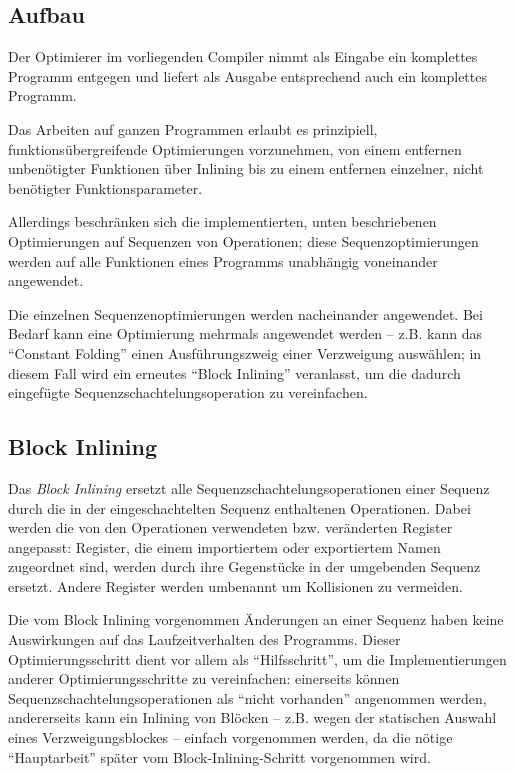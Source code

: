 \documentclass[twoside,a4paper,fleqn,12pt]{book}
\begin{document}
\subsection{Aufbau}


Der Optimierer im vorliegenden Compiler nimmt als Eingabe ein komplettes Programm entgegen
und liefert als Ausgabe entsprechend auch ein komplettes Programm.

Das Arbeiten auf ganzen Programmen erlaubt es prinzipiell, funktionsübergreifende Optimierungen
vorzunehmen, von einem entfernen unbenötigter Funktionen über Inlining bis zu einem entfernen
einzelner, nicht benötigter Funktionsparameter.

Allerdings beschränken sich die implementierten, unten beschriebenen Optimierungen auf Sequenzen
von Operationen; diese Sequenzoptimierungen werden auf alle Funktionen eines Programms unabhängig
voneinander angewendet.

Die einzelnen Sequenzenoptimierungen werden nacheinander angewendet. Bei Bedarf kann eine
Optimierung mehrmals angewendet werden -- z.B. kann das ``Constant Folding'' einen Ausführungszweig
einer Verzweigung auswählen; in diesem Fall wird ein erneutes ``Block Inlining'' veranlasst,
um die dadurch eingefügte Sequenzschachtelungsoperation zu vereinfachen.

\subsection{Block Inlining}

Das \emph{Block Inlining} ersetzt alle Sequenzschachtelungsoperationen einer Sequenz durch
die in der eingeschachtelten Sequenz enthaltenen Operationen. Dabei werden die von den
Operationen verwendeten bzw. veränderten Register angepasst: Register, die einem importiertem
oder exportiertem Namen zugeordnet sind, werden durch ihre Gegenstücke in der umgebenden
Sequenz ersetzt. Andere Register werden umbenannt um Kollisionen zu vermeiden.

Die vom Block Inlining vorgenommen Änderungen an einer Sequenz haben keine Auswirkungen auf das
Laufzeitverhalten des Programms. Dieser Optimierungsschritt dient vor allem als "`Hilfsschritt"',
um die Implementierungen anderer Optimierungsschritte zu vereinfachen: einerseits können
Sequenzschachtelungsoperationen als "`nicht vorhanden"' angenommen werden, andererseits kann
ein Inlining von Blöcken -- z.B. wegen der statischen Auswahl eines Verzweigungsblockes --
einfach vorgenommen werden, da die nötige "`Hauptarbeit"' später vom Block-Inlining-Schritt
vorgenommen wird.
\end{document}
